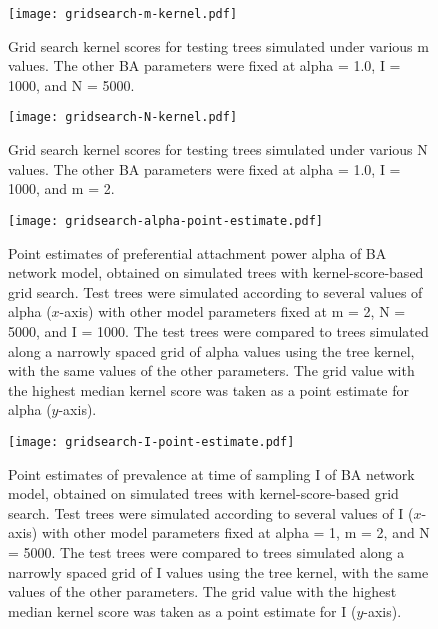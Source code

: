 \begin{figure}[ht]
  \centering
  \texttt{[image: gridsearch-m-kernel.pdf]}
  \caption{                                              
    Grid search kernel scores for testing trees simulated under various             
    \gls{m} values. The other \gls{BA} parameters were fixed at \gls{alpha} =
    1.0, \gls{I} = 1000, and \gls{N} = 5000.
  }        
  \label{fig:gridm}
\end{figure}

\begin{figure}[ht]
  \centering
  \texttt{[image: gridsearch-N-kernel.pdf]}
  \caption{                                              
    Grid search kernel scores for testing trees simulated under various             
    \gls{N} values. The other \gls{BA} parameters were fixed at \gls{alpha} =
    1.0, \gls{I} = 1000, and \gls{m} = 2.
  }        
  \label{fig:gridN}
\end{figure}

\begin{figure}[ht]
  \centering
  \texttt{[image: gridsearch-alpha-point-estimate.pdf]}
  \caption[
      Point estimates of preferential attachment power \gls{alpha} of
      \acrlong{BA} network model, obtained on simulated trees with
      kernel-score-based grid search.]
  {
      Point estimates of preferential attachment power \gls{alpha} of
      \acrlong{BA} network model, obtained on simulated trees with
      kernel-score-based grid search. Test trees were simulated according to
      several values of \gls{alpha} ($x$-axis) with other model parameters
      fixed at \gls{m} = 2, \gls{N} = 5000, and \gls{I} = 1000. The test trees
      were compared to trees simulated along a narrowly spaced grid of
      \gls{alpha} values using the tree kernel, with the same values of the
      other parameters. The grid value with the highest median kernel score was
      taken as a point estimate for \gls{alpha} ($y$-axis).
  }
  \label{fig:gridptalpha}
\end{figure}

\begin{figure}[ht]
  \centering
  \texttt{[image: gridsearch-I-point-estimate.pdf]}
  \caption[ Point estimates of prevalence at time of sampling \gls{I} of
      \acrlong{BA} network model, obtained on simulated trees with
      kernel-score-based grid search. ]
  {
      Point estimates of prevalence at time of sampling \gls{I} of \acrlong{BA}
      network model, obtained on simulated trees with kernel-score-based grid
      search. Test trees were simulated according to several values of \gls{I}
      ($x$-axis) with other model parameters fixed at \gls{alpha} = 1, \gls{m}
      = 2, and \gls{N} = 5000. The test trees were compared to trees simulated
      along a narrowly spaced grid of \gls{I} values using the tree kernel,
      with the same values of the other parameters. The grid value with the
      highest median kernel score was taken as a point estimate for \gls{I}
      ($y$-axis).
  }
  \label{fig:gridptI}
\end{figure}

